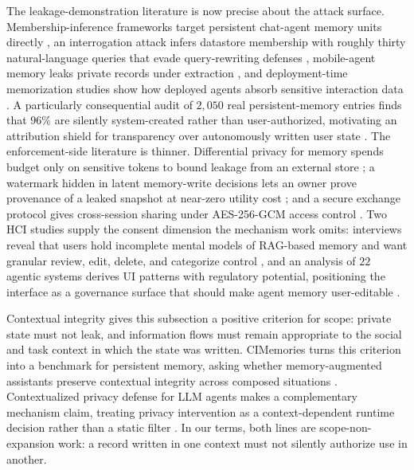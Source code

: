 The leakage-demonstration literature is now precise about the attack surface. Membership-inference frameworks target persistent chat-agent memory units directly \citep{chen2026mrmmia}, an interrogation attack infers datastore membership with roughly thirty natural-language queries that evade query-rewriting defenses \citep{naseh2025riddle}, mobile-agent memory leaks private records under extraction \citep{wang2025mobileagente}, and deployment-time memorization studies show how deployed agents absorb sensitive interaction data \citep{chen2026deploymenttimememorization}. A particularly consequential audit of $2{,}050$ real persistent-memory entries finds that $96\%$ are silently system-created rather than user-authorized, motivating an attribution shield for transparency over autonomously written user state \citep{dash2026selfportrait}. The enforcement-side literature is thinner. Differential privacy for memory spends budget only on sensitive tokens to bound leakage from an external store \citep{koga2024dprag}; a watermark hidden in latent memory-write decisions lets an owner prove provenance of a leaked snapshot at near-zero utility cost \citep{zhang2026memmark}; and a secure exchange protocol gives cross-session sharing under AES-256-GCM access control \citep{masoor2025samep}. Two HCI studies supply the consent dimension the mechanism work omits: interviews reveal that users hold incomplete mental models of RAG-based memory and want granular review, edit, delete, and categorize control \citep{zhang2025ragmemoryperceptions}, and an analysis of $22$ agentic systems derives UI patterns with regulatory potential, positioning the interface as a governance surface that should make agent memory user-editable \citep{feng2025regulatoryui}.

Contextual integrity gives this subsection a positive criterion for scope: private state must not leak, and information flows must remain appropriate to the social and task context in which the state was written. CIMemories turns this criterion into a benchmark for persistent memory, asking whether memory-augmented assistants preserve contextual integrity across composed situations \citep{mireshghallah2025cimemories}. Contextualized privacy defense for LLM agents makes a complementary mechanism claim, treating privacy intervention as a context-dependent runtime decision rather than a static filter \citep{wen2026contextualizedprivacy}. In our terms, both lines are scope-non-expansion work: a record written in one context must not silently authorize use in another.


